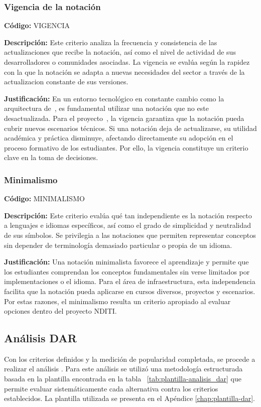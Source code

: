 \subsubsection{Vigencia de la notación}
\textbf{Código:} VIGENCIA

\textbf{Descripción:} Este criterio analiza la frecuencia y consistencia de las actualizaciones que recibe la notación, 
así como el nivel de actividad de sus desarrolladores o comunidades asociadas. La vigencia se evalúa según la rapidez con 
la que la notación se adapta a nuevas necesidades del sector a través de la actualizacion constante de sus versiones.


\textbf{Justificación:} En un entorno tecnológico en constante cambio como la arquitectura de~\TI{}, es fundamental 
utilizar una notación que no este desactualizada. Para el proyecto~\NDITI, la vigencia garantiza que la notación 
pueda cubrir nuevos escenarios técnicos. Si una notación deja de actualizarse, su utilidad académica y práctica 
disminuye, afectando directamente su adopción en el proceso formativo de los estudiantes. Por ello, la vigencia 
constituye un criterio clave en la toma de decisiones.
 

\subsubsection{Minimalismo}
\textbf{Código:} MINIMALISMO

\textbf{Descripción:} Este criterio evalúa qué tan independiente es la notación respecto a lenguajes e idiomas específicos,
así como el grado de simplicidad y neutralidad de sus símbolos. Se privilegia a las notaciones que permiten representar 
conceptos sin depender de terminología demasiado particular o propia de un idioma.


\textbf{Justificación:} Una notación minimalista favorece el aprendizaje y permite que los estudiantes comprendan los 
conceptos fundamentales sin verse limitados por implementaciones o el idioma. Para el área de infraestructura, 
esta independencia facilita que la notación pueda aplicarse en cursos diversos, proyectos y escenarios. Por estas 
razones, el minimalismo resulta un criterio apropiado al evaluar opciones dentro del proyecto NDITI.

\subsection{Análisis DAR}
Con los criterios definidos y la medición de popularidad completada, se procede a realizar el análisis \DAR. Para este análisis se utilizó una metodología estructurada basada en la plantilla encontrada en la tabla ~\ref{tab:plantilla-analisis_dar} que permite evaluar sistemáticamente cada alternativa contra los criterios establecidos. La plantilla utilizada se presenta en el Apéndice \ref{chap:plantilla-dar}.

